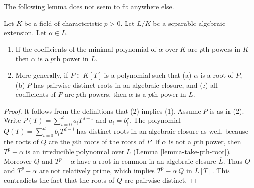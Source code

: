 \noindent
The following lemma does not seem to fit anywhere else.

\begin{lemma}
\label{lemma-pth-root}
Let $K$ be a field of characteristic $p > 0$. Let $L/K$ be a separable
algebraic extension. Let $\alpha \in L$.
\begin{enumerate}
\item If the coefficients of the minimal polynomial of $\alpha$
over $K$ are $p$th powers in $K$ then $\alpha$ is a $p$th
power in $L$.
\item More generally, if $P \in K[T]$ is a polynomial such that (a) $\alpha$
is a root of $P$, (b) $P$ has pairwise distinct roots in an algebraic closure,
and (c) all coefficients of $P$ are $p$th powers, then $\alpha$ is a
$p$th power in $L$.
\end{enumerate}
\end{lemma}

\begin{proof}
It follows from the definitions that (2) implies (1). Assume $P$ is as in (2).
Write $P(T) = \sum\nolimits_{i = 0}^d a_i T^{d - i}$ and $a_i = b_i^p$.
The polynomial $Q(T) = \sum\nolimits_{i = 0}^d b_i T^{d - i}$ has distinct
roots in an algebraic closure as well, because the roots of $Q$
are the $p$th roots of the roots of $P$. If $\alpha$ is not a $p$th power,
then $T^p - \alpha$ is an irreducible polynomial over $L$
(Lemma \ref{lemma-take-pth-root}).
Moreover $Q$ and $T^p - \alpha$ have a root in common in
an algebraic closure $\overline{L}$.
Thus $Q$ and $T^p - \alpha$ are not relatively prime, which
implies $T^p - \alpha | Q$ in $L[T]$. This contradicts the fact that
the roots of $Q$ are pairwise distinct.
\end{proof}


















